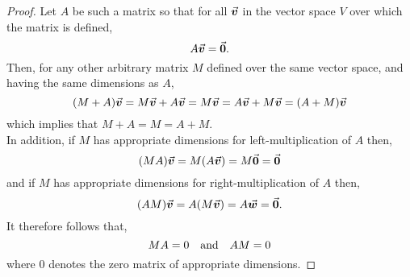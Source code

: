 \documentclass[../MathsNotesBase.tex]{subfiles}
\begin{document}
{		\biggerskip
		\begin{proof}
			Let $A$ be such a matrix so that for all $\vec{\bm{v}}$ in the vector space $V$ over which the matrix is defined,
			\[ A\vec{\bm{v}} = \vec{\bm{0}}. \]
			Then, for any other arbitrary matrix $M$ defined over the same vector space, and having the same dimensions as $A$,
			\[ (M + A)\vec{\bm{v}} = M\vec{\bm{v}} + A\vec{\bm{v}} = M\vec{\bm{v}} = A\vec{\bm{v}} + M\vec{\bm{v}} = (A + M)\vec{\bm{v}} \]
			which implies that ${ M + A = M = A + M }$.\\
			
			In addition, if $M$ has appropriate dimensions for left-multiplication of $A$ then,
			\[ (M A)\vec{\bm{v}} = M(A\vec{\bm{v}}) = M\vec{\bm{0}} = \vec{\bm{0}} \]
			and if $M$ has appropriate dimensions for right-multiplication of $A$ then,
			\[ (A M)\vec{\bm{v}} = A(M\vec{\bm{v}}) = A\vec{\bm{w}} = \vec{\bm{0}}. \]
			It therefore follows that,
			\[ MA = 0 \hspace{10pt}\text{and}\hspace{10pt} AM = 0 \]
			where 0 denotes the zero matrix of appropriate dimensions.
		\end{proof}
	
		\bigskip
}
\end{document}
